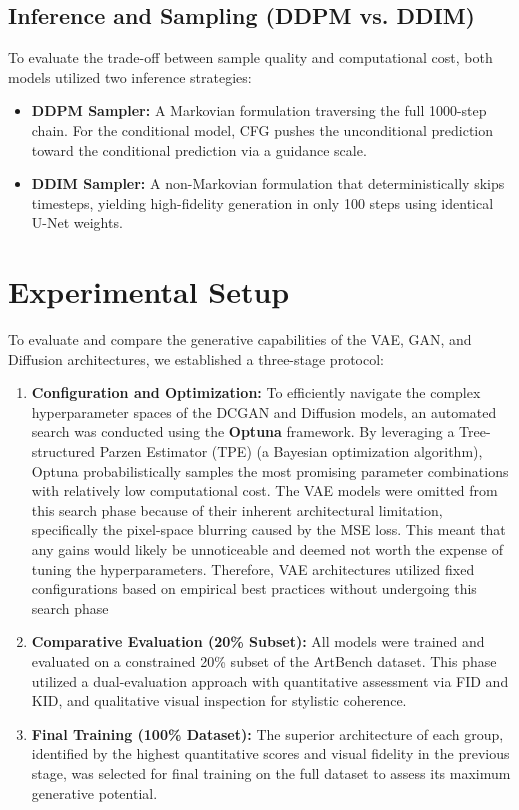 \documentclass[runningheads]{llncs}
\begin{document}
\subsection{Inference and Sampling (DDPM vs. DDIM)}
To evaluate the trade-off between sample quality and computational cost, both models utilized two inference strategies:
\begin{itemize}
    \item \textbf{DDPM Sampler:} A Markovian formulation traversing the full 1000-step chain. For the conditional model, CFG pushes the unconditional prediction toward the conditional prediction via a guidance scale.
    \item \textbf{DDIM Sampler:} A non-Markovian formulation that deterministically skips timesteps, yielding high-fidelity generation in only 100 steps using identical U-Net weights.
\end{itemize}

\section{Experimental Setup}

To evaluate and compare the generative capabilities of the VAE, GAN, and Diffusion architectures, we established a three-stage protocol:

\begin{enumerate}
    \item \textbf{Configuration and Optimization:} To efficiently navigate the complex hyperparameter spaces of the DCGAN and Diffusion models, an automated search was conducted using the \textbf{Optuna} framework. By leveraging a Tree-structured Parzen Estimator (TPE) (a Bayesian optimization algorithm), Optuna probabilistically samples the most promising parameter combinations with relatively low computational cost. The VAE models were omitted from this search phase because of their inherent architectural limitation, specifically the pixel-space blurring caused by the MSE loss. This meant that any gains would likely be unnoticeable and deemed not worth the expense of tuning the hyperparameters. Therefore, VAE architectures utilized fixed configurations based on empirical best practices without undergoing this search phase
    \item \textbf{Comparative Evaluation (20\% Subset):} All models were trained and evaluated on a constrained 20\% subset of the ArtBench dataset. This phase utilized a dual-evaluation approach with quantitative assessment via FID and KID, and qualitative visual inspection for stylistic coherence.
    \item \textbf{Final Training (100\% Dataset):} The superior architecture of each group, identified by the highest quantitative scores and visual fidelity in the previous stage, was selected for final training on the full dataset to assess its maximum generative potential.
\end{enumerate}
\end{document}
